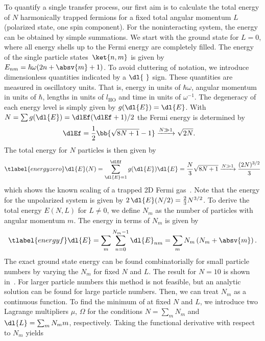 
To quantify a single transfer process, our first aim is to calculate the total energy of $N$ harmonically trapped fermions for a fixed total angular momentum $L$ (polarized state, one spin component). For the noninteracting system, the energy can be obtained by simple summations. We start with the ground state for $L=0$, where all energy shells up to the Fermi energy are completely filled. The energy of the single particle states~$\ket{n,m}$ is given by $E_{nm}=\hbar\omega(2n+\absv{m}+1)$. To avoid cluttering of notation, we introduce dimensionless quantities indicated by a $\dl{\ }$ sign. These quantities are measured in oscillatory units. That is, energy in units of $\hbar\omega$, angular momentum in units of $\hbar$, lengths in units of $l_\text{HO}$ and time in units of $\omega^{-1}$. The degeneracy of each energy level is simply given by $g(\dl{E}) = \dl{E}$.
With $N=\sum g(\dl{E}) = \dlEf(\dlEf+1)/2$ the Fermi energy is determined by
\begin{align}
\dlEf &= \frac{1}{2}\bb{\sqrt{8N+1}-1} \xrightarrow{N\gg 1} \sqrt{2N}.
\end{align}
The total energy for $N$ particles is then given by
\begin{align} \tlabel{energyzero}
\dl{E}(N) = \sum_{\dl{E}=1}^{\dlEf} g(\dl{E}) \dl{E} = \frac{N}{3} \sqrt{8N+1} \xrightarrow{N\gg 1} \frac{(2N)^{3/2}}{3}
\end{align}
which shows the known scaling of a trapped 2D Fermi gas~\cite{Yoshimoto2003}.
Note that the energy for the unpolarized system is given by $2\,\dl{E}(N/2)=\frac{2}{3} N^{3/2}$.
To derive the total energy $E(N,L)$ for $L\ne 0$, we define $N_m$ as the number of particles with angular momentum $m$. The energy in terms of $N_m$ is given by
\begin{align} \tlabel{energyf}
\dl{E} = \sum_m \sum_{n=0}^{N_m-1} \dl{E}_{nm} = \sum_m N_m\left(N_m + \absv{m} \right).
\end{align}
The exact ground state energy can be found combinatorially for small particle numbers by varying the $N_m$ for fixed $N$ and $L$. The result for $N=10$ is shown in~. For larger particle numbers this method is not feasible, but an analytic solution can be found for large particle numbers. Then, we can treat $N_{m}$ as a continuous function. To find the minimum of  at fixed $N$ and $L$, we introduce two Lagrange multipliers $\mu$, $\Omega$ for the conditions $N = \sum_m N_m$ and $\dl{L} = \sum_m N_m m$, respectively. Taking the functional derivative with respect to $N_m$ yields
